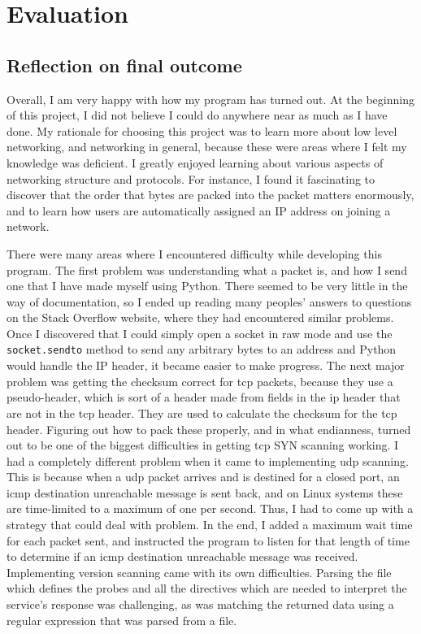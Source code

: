 \documentclass[titlepage]{article}
\let\Oldsection\section{}
\renewcommand{\section}{\clearpage\FloatBarrier\Oldsection}
\let\Oldsubsection\subsection{}
\renewcommand{\subsection}{\FloatBarrier\Oldsubsection}
\begin{document}
\section{Evaluation}

\subsection{Reflection on final outcome}

Overall, I am very happy with how my program has turned out. At the beginning of this
project, I did not believe I could do anywhere near as much as I have done.
My rationale for choosing this project was to learn more about low level networking,
and networking in general, because these were areas where I felt my knowledge was deficient.
I greatly enjoyed learning about various aspects of networking structure and protocols.
For instance, I found it fascinating to discover that the order that bytes are packed into the packet matters
enormously, and to learn how users are automatically assigned an IP address on joining a network.

There were many areas where I encountered difficulty while developing this program.
The first problem was understanding what a packet is, and how I send one that I have made myself
using Python. There seemed to be very little in the way of documentation, so I ended up reading
many peoples' answers to questions on the Stack Overflow website, where they had encountered similar problems.
Once I discovered that I could simply open a socket in raw mode and use the \verb|socket.sendto|
method to send any arbitrary bytes to an address and Python would handle the IP header,
it became easier to make progress. The next major problem was getting the
checksum correct for \gls{tcp} packets, because they use a pseudo-header, which
is sort of a header made from fields in the \gls{ip} header that are not
in the \gls{tcp} header. They are used to calculate the checksum for the \gls{tcp}
header. Figuring out how to pack these properly, and in what endianness, turned out to be
one of the biggest difficulties in getting \gls{tcp} SYN scanning working.
I had a completely different problem when it came to implementing \gls{udp}
scanning. This is because when a \gls{udp} packet arrives and is destined for a closed port,
an \gls{icmp} destination unreachable message is sent back, and on Linux systems these are time-limited
to a maximum of one per second. 
Thus, I had to come up with a strategy that could deal with problem.
In the end, I added a maximum wait time for each packet sent, and instructed the program to listen
for that length of time to determine if an \gls{icmp} destination unreachable message was received.
Implementing version scanning came with its own difficulties.
Parsing the file which defines the probes and all the directives which are needed to interpret the service's
response was challenging, as was matching the returned data using a regular expression that was parsed from a file.
\end{document}
